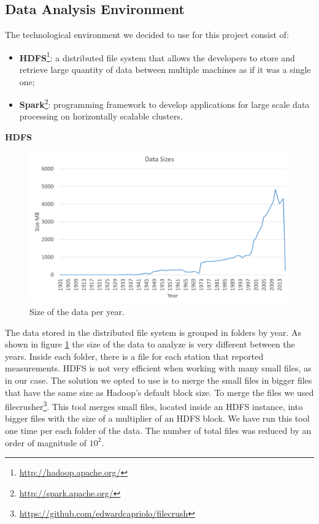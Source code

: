 \documentclass{vldb}
\begin{document}
\subsection{Data Analysis Environment}
The technological environment we decided to use for this project consist of:
\begin{itemize}
    \item \textbf{HDFS}\footnote{\href{Hadoop Distributed File System}{http://hadoop.apache.org/}}: a distributed file system that allows the developers to store and retrieve large quantity of data between multiple machines as if it was a single one;
    \item \textbf{Spark}\footnote{\href{Apache Spark}{http://spark.apache.org/}}: programming framework to develop applications for large scale data processing on horizontally scalable clusters.
\end{itemize}

\textbf{HDFS}

\begin{figure}[tbh]
\includegraphics[width=1\linewidth]{dataSize}
\caption{Size of the data per year.}
\label{fig:dataSize}
\end{figure}

The data stored in the distributed file system is grouped in folders by year. As shown in figure \ref{fig:dataSize} the size of the data to analyze is very different between the years. Inside each folder, there is a file for each station that reported measurements. HDFS is not very efficient when working with many small files\cite{zhang2012improving}, as in our case. The solution we opted to use is to merge the small files in bigger files that have the same size as Hadoop's default block size. To merge the files we used filecrusher\footnote{\href{Hadoop Filecrusher}{https://github.com/edwardcapriolo/filecrush}}. This tool merges small files, located inside an HDFS instance, into bigger files with the size of a multiplier of an HDFS block. We have run this tool one time per each folder of the data. The number of total files was reduced by an order of magnitude of $10^2$.\\
\end{document}
